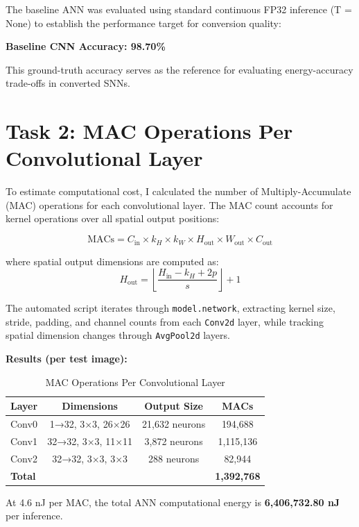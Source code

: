 \documentclass[11pt, a4paper]{article}
\begin{document}
The baseline ANN was evaluated using standard continuous FP32 inference (T = None) to establish the performance target for conversion quality:

\textbf{Baseline CNN Accuracy: 98.70\%}

This ground-truth accuracy serves as the reference for evaluating energy-accuracy trade-offs in converted SNNs.

\section{Task 2: MAC Operations Per Convolutional Layer}

To estimate computational cost, I calculated the number of Multiply-Accumulate (MAC) operations for each convolutional layer. The MAC count accounts for kernel operations over all spatial output positions:

\[
\text{MACs} = C_{\text{in}} \times k_H \times k_W \times H_{\text{out}} \times W_{\text{out}} \times C_{\text{out}}
\]

where spatial output dimensions are computed as:
\[
H_{\text{out}} = \left\lfloor \frac{H_{\text{in}} - k_H + 2p}{s} \right\rfloor + 1
\]

The automated script iterates through \texttt{model.network}, extracting kernel size, stride, padding, and channel counts from each \texttt{Conv2d} layer, while tracking spatial dimension changes through \texttt{AvgPool2d} layers.

\textbf{Results (per test image):}
\begin{table}[htbp]
  \centering
  \caption{MAC Operations Per Convolutional Layer}
  \label{tab:mac_ops}
  \renewcommand{\arraystretch}{1.2}
  \begin{tabular}{l c c c}
    \toprule
    \textbf{Layer} & \textbf{Dimensions} & \textbf{Output Size} & \textbf{MACs} \\
    \midrule
    Conv0 & 1→32, 3×3, 26×26 & 21,632 neurons & 194,688 \\
    Conv1 & 32→32, 3×3, 11×11 & 3,872 neurons & 1,115,136 \\
    Conv2 & 32→32, 3×3, 3×3 & 288 neurons & 82,944 \\
    \midrule
    \textbf{Total} & & & \textbf{1,392,768} \\
    \bottomrule
  \end{tabular}
\end{table}

At 4.6 nJ per MAC, the total ANN computational energy is \textbf{6,406,732.80 nJ} per inference.
\end{document}
